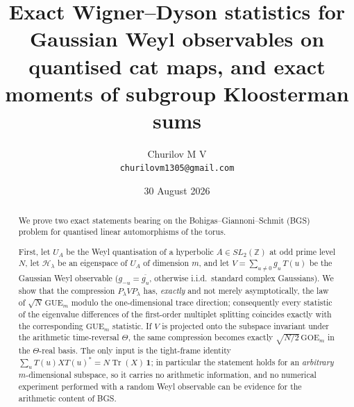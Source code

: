\documentclass[11pt,reqno]{amsart}
\theoremstyle{definition}
\DeclareMathOperator{\Tr}{Tr}
\newcommand{\ZZ}{\mathbb{Z}}
\newcommand{\HH}{\mathcal{H}}
\newcommand{\GUE}{\mathrm{GUE}}
\newcommand{\GOE}{\mathrm{GOE}}
\begin{document}
\title[Exact Wigner--Dyson statistics and subgroup Kloosterman moments]
{Exact Wigner--Dyson statistics for Gaussian Weyl observables on quantised cat
maps, and exact moments of subgroup Kloosterman sums}

\author{Churilov M V\\\texttt{churilovm1305@gmail.com}}
\date{30 August 2026}

\begin{abstract}
We prove two exact statements bearing on the Bohigas--Giannoni--Schmit (BGS)
problem for quantised linear automorphisms of the torus.

First, let $U_A$ be the Weyl quantisation of a hyperbolic $A\in SL_2(\ZZ)$ at
odd prime level $N$, let $\HH_\lambda$ be an eigenspace of $U_A$ of dimension
$m$, and let $V=\sum_{u\neq 0}g_u\,T(u)$ be the Gaussian Weyl observable
($g_{-u}=\overline{g_u}$, otherwise i.i.d.\ standard complex Gaussians). We show
that the compression $P_\lambda VP_\lambda$ has, \emph{exactly} and not merely
asymptotically, the law of $\sqrt{N}\,\GUE_m$ modulo the one-dimensional trace
direction; consequently every statistic of the eigenvalue differences of the
first-order multiplet splitting coincides exactly with the corresponding
$\GUE_m$ statistic. If $V$ is projected onto the subspace invariant under the
arithmetic time-reversal $\Theta$, the same compression becomes exactly
$\sqrt{N/2}\,\GOE_m$ in the $\Theta$-real basis. The only input is the
tight-frame identity $\sum_u T(u)XT(u)^*=N\Tr(X)\,\mathbf 1$; in particular the
statement holds for an \emph{arbitrary} $m$-dimensional subspace, so it carries
no arithmetic information, and no numerical experiment performed with a random
Weyl observable can be evidence for the arithmetic content of BGS.


\end{abstract}
\end{document}
